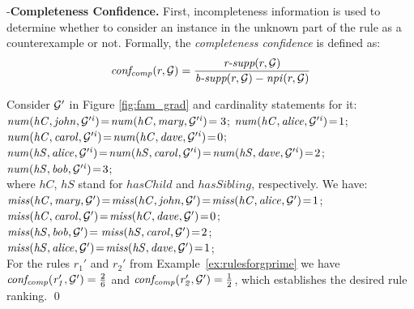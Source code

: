 \noindent -\textbf{Completeness Confidence.} First, incompleteness information is used to determine whether to consider an instance in the unknown part of the rule as a counterexample or not. Formally, the \emph{completeness confidence} is defined as:
\begin{align*}
\mathit{conf_{comp}}(r,\mathcal{G}) = \frac{\textit{r-supp}(r,\mathcal{G})}{\textit{b-supp}(r,\mathcal{G}) - \mathit{npi}(r,\mathcal{G})}
\end{align*}
\begin{example}
Consider $\mathcal{G}'$ in Figure \ref{fig:fam_grad}
and cardinality statements for it:\\
$\mathit{num(hC,john,\mathcal{G}'^i)}\!=\!\mathit{num(hC,mary,\mathcal{G}'^i)}\!=3$; $\mathit{num(hC,alice,\mathcal{G}'^i)}\!=\!1$; \\
$\mathit{num(hC,carol,\mathcal{G}'^i)}\!=\!\mathit{num(hC,dave,\mathcal{G}'^i)}\!=\!0$;\\
$\mathit{num(hS,alice,\mathcal{G}'^i)}\!=\!\mathit{num(hS,carol,\mathcal{G}'^i)}\!=\!\mathit{num(hS,dave,\mathcal{G}'^i)}\!=\!2$;\\ 
$\mathit{num(hS,bob,\mathcal{G}'^i)}\!=\!3$;\\
where $hC$, $hS$ stand for $hasChild$ and $hasSibling$, respectively. We have:\\
$\mathit{miss(hC,mary,\mathcal{G}')}\!=\!\mathit{miss(hC,john,\mathcal{G}')}\!=\!\mathit{miss(hC,alice,\mathcal{G}')}\!=\!1$;\\ 
$\mathit{miss(hC,carol,\mathcal{G}')}\!=\!\mathit{miss(hC,dave,\mathcal{G}')}\!=\!0$;\\
$\mathit{miss(hS,bob,\mathcal{G}')}\!=\mathit{miss(hS,carol,\mathcal{G}')}\!=\!2$;\\
$\mathit{miss(hS,alice,\mathcal{G}')}\!=\!\mathit{miss(hS,dave,\mathcal{G}')}\!=\!1$;\\
For the rules $r_1'$ and $r_2'$ from Example~\ref{ex:rulesforgprime} we have
 $\mathit{conf_{comp}(r_1', \mathcal{G}')}=\frac{2}{6}$ and $\mathit{conf_{comp}(r_2', \mathcal{G}')}=\frac{1}{2}$, which establishes the desired rule ranking.
\qed
\end{example}

